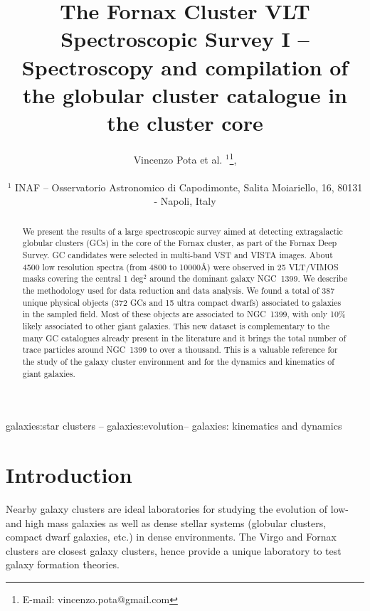 \documentclass[useAMS,usenatbib]{mn2e}
\title[The Fornax Cluster VLT Spectroscopic Survey]{The Fornax Cluster VLT Spectroscopic Survey I -- Spectroscopy and compilation of the globular cluster catalogue in the cluster core}
\author[Pota et al.]{\noindent
Vincenzo Pota et al. $^{1}$\thanks{E-mail: vincenzo.pota@gmail.com}, 
\\~\\
$^1$ INAF -- Osservatorio Astronomico di Capodimonte, Salita Moiariello, 16, 80131 - Napoli, Italy\\
}
\begin{document}
\label{firstpage}

\maketitle
\begin{abstract}
We present the results of a large spectroscopic survey aimed at detecting extragalactic globular clusters (GCs) in the core of the Fornax cluster, as part of the Fornax Deep Survey. GC candidates were selected in multi-band VST and VISTA images. About 4500 low resolution spectra (from 4800 to 10000\AA) were observed in 25 VLT/VIMOS masks covering the central 1 deg$^2$ around the dominant galaxy NGC~1399. We describe the methodology used for data reduction and data analysis. We found a total of 387 unique physical objects (372 GCs and 15 ultra compact dwarfs) associated to galaxies in the sampled field. Most of these objects are associated to NGC~1399, with only 10\% likely associated to other giant galaxies. This new dataset is complementary to the many GC catalogues already present in the literature and it brings the total number of trace particles around  NGC~1399 to over a thousand. This is a valuable reference for the study of the galaxy cluster environment and for the dynamics and kinematics of giant galaxies. 

\end{abstract}

\begin{keywords}
galaxies:star clusters -- galaxies:evolution-- galaxies: kinematics and dynamics
\end{keywords}

\section{Introduction}

Nearby galaxy clusters are ideal laboratories for studying the evolution of low- and high mass galaxies as well as dense stellar systems (globular clusters, compact dwarf galaxies, etc.) in dense environments. The Virgo and Fornax clusters are closest galaxy clusters, hence provide a unique laboratory to test galaxy formation theories. 
\end{document}
